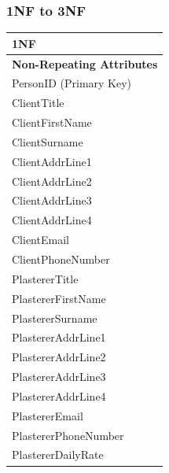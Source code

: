 \subsubsection{1NF to 3NF}
\begin{flushleft}
    \begin{longtable}{|p{12cm}|}
        \hline
			 \textbf{1NF} \\ \hline
         \textbf{Non-Repeating Attributes} \\ \hline
			PersonID (Primary Key) \\ 
         ClientTitle \\
			ClientFirstName \\
			ClientSurname \\
			ClientAddrLine1 \\
			ClientAddrLine2 \\
			ClientAddrLine3 \\
			ClientAddrLine4 \\
			ClientEmail \\
			ClientPhoneNumber \\
			PlastererTitle \\
			PlastererFirstName \\
			PlastererSurname \\
			PlastererAddrLine1 \\
			PlastererAddrLine2 \\
			PlastererAddrLine3 \\
			PlastererAddrLine4 \\
			PlastererEmail \\
			PlastererPhoneNumber \\
			PlastererDailyRate \\ \hline


\end{longtable}
\end{flushleft}
